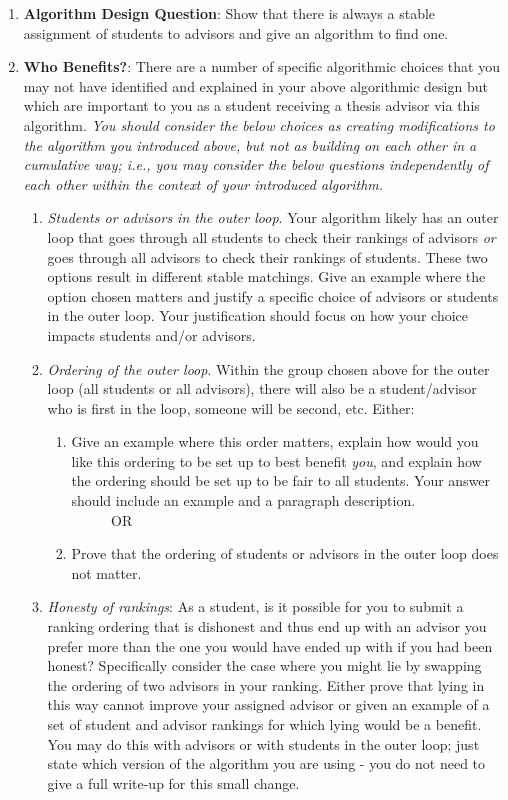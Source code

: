 \documentclass[12pt]{article}
\begin{document}
\begin{enumerate}
\item \textbf{Algorithm Design Question}: Show that there is always a stable assignment of students to advisors and give an algorithm to find one.
\item \textbf{Who Benefits?}:  There are a number of specific algorithmic choices that you may not have identified and explained in your above algorithmic design but which are important to you as a student receiving a thesis advisor via this algorithm.   \emph{You should consider the below choices as creating modifications to the algorithm you introduced above, but not as building on each other in a cumulative way; i.e., you may consider the below questions independently of each other within the context of your introduced algorithm.}
	\begin{enumerate}
	\item \emph{Students or advisors in the outer loop}. Your algorithm likely has an outer loop that goes through all students to check their rankings of advisors \emph{or} goes through all advisors to check their rankings of students.  These two options result in different stable matchings.  Give an example where the option chosen matters and justify a specific choice of advisors or students in the outer loop.  Your justification should focus on how your choice impacts students and/or advisors.
	\item \emph{Ordering of the outer loop}.  Within the group chosen above for the outer loop (all students or all advisors), there will also be a student/advisor who is first in the loop, someone will be second, etc.  Either:
		\begin{enumerate}
		\item Give an example where this order matters, explain how would you like this ordering to be set up to best benefit \emph{you}, and explain how the ordering should be set up to be fair to all students.  Your answer should include an example and a paragraph description.  \\
		~~~~~ OR
		\item Prove that the ordering of students or advisors in the outer loop does not matter.
		\end{enumerate}
	\item \emph{Honesty of rankings}: As a student, is it possible for you to submit a ranking ordering that is dishonest and thus end up with an advisor you prefer more than the one you would have ended up with if you had been honest? Specifically consider the case where you might lie by swapping the ordering of two advisors in your ranking. Either prove that lying in this way cannot improve your assigned advisor or given an example of a set of student and advisor rankings for which lying would be a benefit.  You may do this with advisors or with students in the outer loop; just state which version of the algorithm you are using - you do not need to give a full write-up for this small change.
	\end{enumerate}

\end{enumerate}
\end{document}
